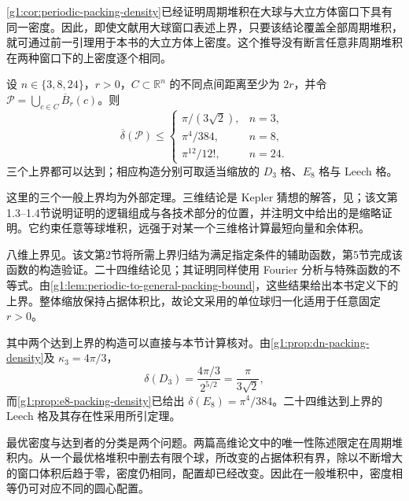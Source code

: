\cref{g1:cor:periodic-packing-density}已经证明周期堆积在大球与大立方体窗口下具有同一密度。因此，即使文献用大球窗口表述上界，只要该结论覆盖全部周期堆积，就可通过前一引理用于本书的大立方体上密度。这个推导没有断言任意非周期堆积在两种窗口下的上密度逐个相同。

\begin{theorem}
	\label{g1:thm:sphere-packing-external-optima}
	设 \(n\in\{3,8,24\}\)，\(r>0\)，\(C\subset\mathbb R^n\) 的不同点间距离至少为 \(2r\)，并令 \(\mathcal P=\bigcup_{c\in C}\overline B_r(c)\)。则
	\[
		\overline\delta(\mathcal P)\le
		\begin{cases}
			\pi/(3\sqrt2),&n=3,\\[2pt]
			\pi^4/384,&n=8,\\[2pt]
			\pi^{12}/12!,&n=24.
		\end{cases}
	\]
	三个上界都可以达到；相应构造分别可取适当缩放的 \(D_3\) 格、\(E_8\) 格与 Leech 格。
\end{theorem}

这里的三个一般上界均为外部定理。三维结论是 Kepler 猜想的解答，见\cite[定理1.1，第1067页]{Hales2005Kepler}；该文第1.3--1.4节说明证明的逻辑组成与各技术部分的位置，并注明文中给出的是缩略证明。它约束任意等球堆积，远强于对某一个三维格计算最短向量和余体积。

\ProseParagraphBreak

八维上界见\cite[定理1，第992页；第2节、第5节]{Viazovska2017SpherePacking8}。该文第2节将所需上界归结为满足指定条件的辅助函数，第5节完成该函数的构造验证。二十四维结论见\cite[定理1.1，第1017--1018页；第4节及附录A]{CohnKumarMillerRadchenkoViazovska2017SpherePacking24}；其证明同样使用 Fourier 分析与特殊函数的不等式。由\cref{g1:lem:periodic-to-general-packing-bound}，这些结果给出本书定义下的上界。整体缩放保持占据体积比，故论文采用的单位球归一化适用于任意固定 \(r>0\)。

\ProseParagraphBreak

其中两个达到上界的构造可以直接与本节计算核对。由\cref{g1:prop:dn-packing-density}及 \(\kappa_3=4\pi/3\)，
\[
	\delta(D_3)=\frac{4\pi/3}{2^{5/2}}=\frac{\pi}{3\sqrt2},
\]
而\cref{g1:prop:e8-packing-density}已给出 \(\delta(E_8)=\pi^4/384\)。二十四维达到上界的 Leech 格及其存在性采用所引定理。

\ProseParagraphBreak

最优密度与达到者的分类是两个问题。两篇高维论文中的唯一性陈述限定在周期堆积内。从一个最优格堆积中删去有限个球，所改变的占据体积有界，除以不断增大的窗口体积后趋于零，密度仍相同，配置却已经改变。因此在一般堆积中，密度相等仍可对应不同的圆心配置。

